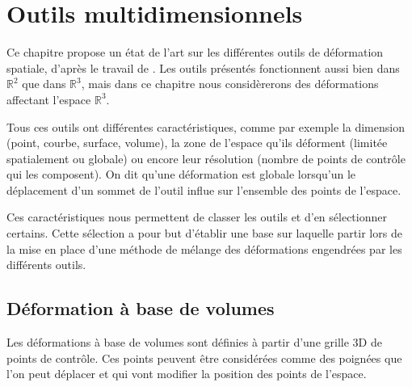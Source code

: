 

\chapter{Outils multidimensionnels}

\graphicspath{{Chapter1/Chapter1Figs/PNG/}{Chapter1/Chapter1Figs/PDF/}{Chapter1/Chapter1Figs/}}

Ce chapitre propose un état de l'art sur les différentes outils de déformation
spatiale, d'après le travail de \cite{GB08}. Les outils présentés fonctionnent
aussi bien dans $\mathbb{R}^2$ que dans $\mathbb{R}^3$, mais dans ce chapitre
nous considèrerons des déformations affectant l'espace $\mathbb{R}^3$.

Tous ces outils ont différentes caractéristiques, comme par exemple la
dimension (point, courbe, surface, volume), la zone de l'espace qu'ils
déforment (limitée spatialement ou globale) ou encore leur résolution (nombre
de points de contrôle qui les composent). On dit qu'une déformation est
globale lorsqu'un le déplacement d'un sommet de l'outil influe sur l'ensemble
des points de l'espace.

Ces caractéristiques nous permettent de classer les outils et d'en
sélectionner certains. Cette sélection a pour but d'établir une base sur
laquelle partir lors de la mise en place d'une méthode de mélange des
déformations engendrées par les différents outils.

\section{Déformation à base de volumes}

Les déformations à base de volumes sont définies à partir d'une grille 3D de
points de contrôle. Ces points peuvent être considérées comme des poignées que
l'on peut déplacer et qui vont modifier la position des points de l'espace.

